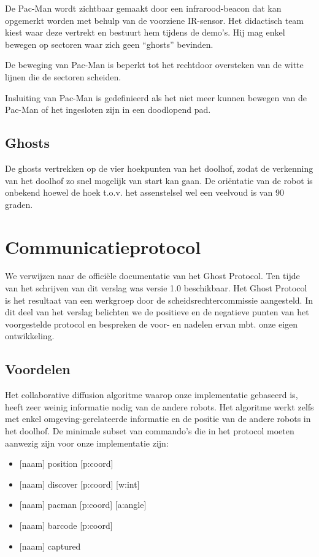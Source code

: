 \documentclass[12pt,a4paper]{report}
\begin{document}
De Pac-Man wordt zichtbaar gemaakt door een infrarood-beacon dat kan opgemerkt worden met behulp van de voorziene IR-sensor. Het didactisch team kiest waar deze vertrekt en bestuurt hem tijdens de demo's. Hij mag enkel bewegen op sectoren waar zich geen ``ghosts'' bevinden.

De beweging van Pac-Man is beperkt tot het rechtdoor oversteken van de witte lijnen die de sectoren scheiden.

Insluiting van Pac-Man is gedefinieerd als het niet meer kunnen bewegen van de Pac-Man of het ingesloten zijn in een doodlopend pad.

\subsection{Ghosts}

De ghosts vertrekken op de vier hoekpunten van het doolhof, zodat de verkenning van het doolhof zo snel mogelijk van start kan gaan. De ori\"entatie van de robot is onbekend hoewel de hoek t.o.v. het assenstelsel wel een veelvoud is van 90 graden.


\section{Communicatieprotocol}

We verwijzen naar de offici\"ele documentatie van het Ghost Protocol. Ten tijde van het schrijven van dit verslag was versie 1.0 beschikbaar. Het Ghost Protocol is het resultaat van een werkgroep door de scheidsrechtercommissie aangesteld. In dit deel van het verslag belichten we de positieve en de negatieve punten van het voorgestelde protocol en bespreken de voor- en nadelen ervan mbt. onze eigen ontwikkeling.

\subsection{Voordelen}

Het collaborative diffusion algoritme waarop onze implementatie gebaseerd is, heeft zeer weinig informatie nodig van de andere robots. Het algoritme werkt zelfs met enkel omgeving-gerelateerde informatie en de positie van de andere robots in het doolhof. De minimale subset van commando's die in het protocol moeten aanwezig zijn voor onze implementatie zijn:

\begin{itemize}
	\item{ [naam] position [p:coord]}
	\item{ [naam] discover [p:coord] [w:int]}
	\item{ [naam] pacman [p:coord] [a:angle]}
	\item{ [naam] barcode [p:coord] }
	\item{ [naam] captured }
\end{itemize}
\end{document}
